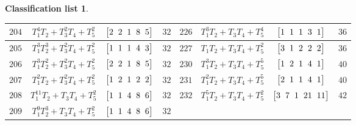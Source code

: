 \documentclass[10pt,a4paper]{amsart}
\theoremstyle{definition}
\newtheorem{class-list}[thm]{Classification list}
\numberwithin{equation}{section}
\begin{document}
\begin{class-list}
\begin{table}[t!]
\begin{tabu}{c|c|c|c||c|c|c|c}
\\ \hline
${204}$&${T_{1}^{4}T_{2}+T_{3}^{2}T_{4}+T_{5}^{2}}$
&$\arraycolsep=1mm\begin{bmatrix}{2} & {2} & {1} & {8} & {5}\end{bmatrix}$&${32}$
&${226}$&${T_{1}^{3}T_{2}+T_{3}T_{4}+T_{5}^{4}}$
&$\arraycolsep=1mm\begin{bmatrix}{1} & {1} & {1} & {3} & {1}\end{bmatrix}$&${36}$
\\ \hline
${205}$&${T_{1}^{3}T_{2}^{3}+T_{3}^{2}T_{4}+T_{5}^{2}}$
&$\arraycolsep=1mm\begin{bmatrix}{1} & {1} & {1} & {4} & {3}\end{bmatrix}$&${32}$
&${227}$&${T_{1}T_{2}+T_{3}T_{4}+T_{5}^{2}}$
&$\arraycolsep=1mm\begin{bmatrix}{3} & {1} & {2} & {2} & {2}\end{bmatrix}$&${36}$
\\ \hline
${206}$&${T_{1}^{3}T_{2}^{2}+T_{3}^{2}T_{4}+T_{5}^{2}}$
&$\arraycolsep=1mm\begin{bmatrix}{2} & {2} & {1} & {8} & {5}\end{bmatrix}$&${32}$
&${230}$&${T_{1}^{3}T_{2}+T_{3}T_{4}+T_{5}^{5}}$
&$\arraycolsep=1mm\begin{bmatrix}{1} & {2} & {1} & {4} & {1}\end{bmatrix}$&${40}$
\\ \hline
${207}$&${T_{1}^{2}T_{2}+T_{3}^{2}T_{4}+T_{5}^{2}}$
&$\arraycolsep=1mm\begin{bmatrix}{1} & {2} & {1} & {2} & {2}\end{bmatrix}$&${32}$
&${231}$&${T_{1}^{2}T_{2}+T_{3}T_{4}+T_{5}^{5}}$
&$\arraycolsep=1mm\begin{bmatrix}{2} & {1} & {1} & {4} & {1}\end{bmatrix}$&${40}$
\\ \hline
${208}$&${T_{1}^{11}T_{2}+T_{3}T_{4}+T_{5}^{2}}$
&$\arraycolsep=1mm\begin{bmatrix}{1} & {1} & {4} & {8} & {6}\end{bmatrix}$&${32}$
&${232}$&${T_{1}^{5}T_{2}+T_{3}T_{4}+T_{5}^{2}}$
&$\arraycolsep=1mm\begin{bmatrix}{3} & {7} & {1} & {21} & {11}\end{bmatrix}$&${42}$
\\ \hline
${209}$&${T_{1}^{9}T_{2}^{3}+T_{3}T_{4}+T_{5}^{2}}$
&$\arraycolsep=1mm\begin{bmatrix}{1} & {1} & {4} & {8} & {6}\end{bmatrix}$&${32}$

\end{tabu}
\end{table}
\end{class-list}
\end{document}
